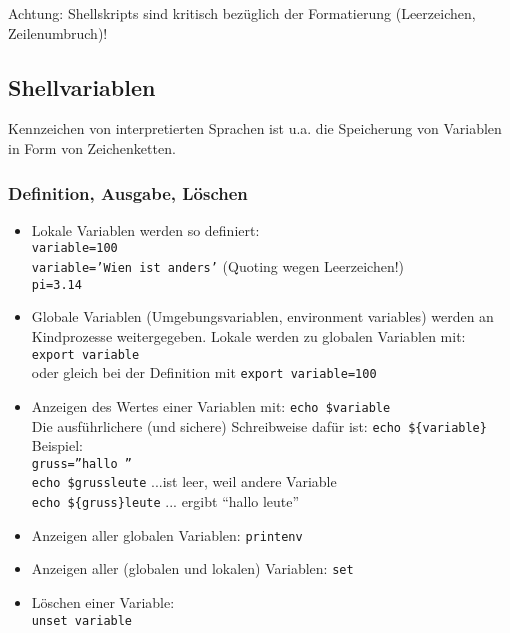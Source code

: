 \documentclass[11pt]{article}
\begin{document}
Achtung: Shellskripts sind kritisch bezüglich der Formatierung (Leerzeichen, Zeilenumbruch)!

\subsection{Shellvariablen}
Kennzeichen von interpretierten Sprachen ist u.a. die Speicherung von
Variablen in Form von Zeichenketten. 

\subsubsection{Definition, Ausgabe, Löschen}
\begin{itemize}
\item Lokale Variablen werden so definiert:\\
\texttt{variable=100}\\
\texttt{variable='Wien ist anders'} (Quoting wegen Leerzeichen!)\\
\texttt{pi=3.14}

\item Globale Variablen (Umgebungsvariablen, environment variables) werden
an Kindprozesse weitergegeben. Lokale werden zu globalen Variablen
mit:
\texttt{export variable}\\
oder gleich bei der Definition mit
\texttt{export variable=100}

\item Anzeigen des Wertes einer Variablen mit:
\texttt{echo \$variable}\\
Die ausführlichere (und sichere) Schreibweise dafür ist: 
\texttt{echo \$\{variable\}}\\

Beispiel:\\
\texttt{gruss=''hallo ''}\\
\texttt{echo \$grussleute} ...ist leer, weil andere Variable\\
\texttt{echo \$\{gruss\}leute} ... ergibt ``hallo leute'' 

\item Anzeigen aller globalen Variablen:
\texttt{printenv}

\item Anzeigen aller (globalen und lokalen) Variablen:
\texttt{set}

\item Löschen einer Variable:\\
\texttt{unset variable}
\end{itemize}
\end{document}
